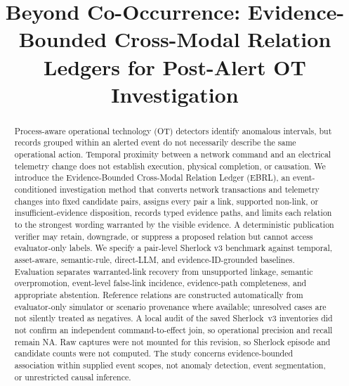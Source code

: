 \documentclass[conference]{IEEEtran}
\newcommand{\NA}{\textsc{NA}}
\begin{document}
\title{Beyond Co-Occurrence: Evidence-Bounded Cross-Modal Relation Ledgers for Post-Alert OT Investigation}
\author{
}
\maketitle

\begin{abstract}
Process-aware operational technology (OT) detectors identify anomalous intervals, but records grouped within an alerted event do not necessarily describe the same operational action. Temporal proximity between a network command and an electrical telemetry change does not establish execution, physical completion, or causation. We introduce the Evidence-Bounded Cross-Modal Relation Ledger (EBRL), an event-conditioned investigation method that converts network transactions and telemetry changes into fixed candidate pairs, assigns every pair a link, supported non-link, or insufficient-evidence disposition, records typed evidence paths, and limits each relation to the strongest wording warranted by the visible evidence. A deterministic publication verifier may retain, downgrade, or suppress a proposed relation but cannot access evaluator-only labels. We specify a pair-level Sherlock v3 benchmark against temporal, asset-aware, semantic-rule, direct-LLM, and evidence-ID-grounded baselines. Evaluation separates warranted-link recovery from unsupported linkage, semantic overpromotion, event-level false-link incidence, evidence-path completeness, and appropriate abstention. Reference relations are constructed automatically from evaluator-only simulator or scenario provenance where available; unresolved cases are not silently treated as negatives. A local audit of the saved Sherlock~v3 inventories did not confirm an independent command-to-effect join, so operational precision and recall remain \NA{}. Raw captures were not mounted for this revision, so Sherlock episode and candidate counts were not computed. The study concerns evidence-bounded association within supplied event scopes, not anomaly detection, event segmentation, or unrestricted causal inference.
\end{abstract}
\end{document}
